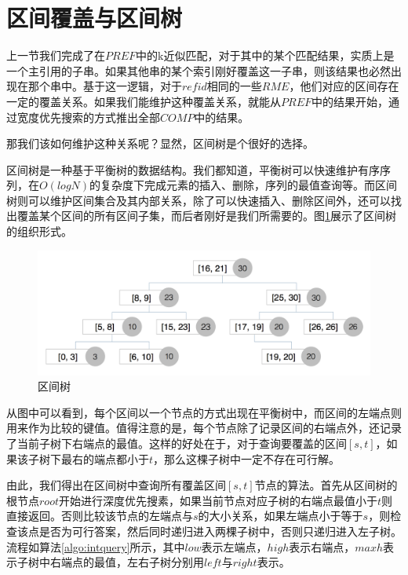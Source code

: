 ﻿\documentclass{sysuthesis}
\begin{document}
\section{区间覆盖与区间树}
上一节我们完成了在$PREF$中的k近似匹配，对于其中的某个匹配结果，实质上是一个主引用的子串。如果其他串的某个索引刚好覆盖这一子串，则该结果也必然出现在那个串中。基于这一逻辑，对于$refid$相同的一些$RME$，他们对应的区间存在一定的覆盖关系。如果我们能维护这种覆盖关系，就能从$PREF$中的结果开始，通过宽度优先搜索的方式推出全部$COMP$中的结果。\par
那我们该如何维护这种关系呢？显然，区间树\cite{cormen2009introduction}是个很好的选择。\par
区间树是一种基于平衡树的数据结构。我们都知道，平衡树可以快速维护有序序列，在$O(logN)$的复杂度下完成元素的插入、删除，序列的最值查询等。而区间树则可以维护区间集合及其内部关系，除了可以快速插入、删除区间外，还可以找出覆盖某个区间的所有区间子集，而后者刚好是我们所需要的。图\ref{image:intvtree}展示了区间树的组织形式。\par

\begin{figure}[htbp]
	\centering
	\includegraphics[scale=0.25]{image/intvtree.png}
	\caption{区间树}\label{image:intvtree}
\end{figure}

从图中可以看到，每个区间以一个节点的方式出现在平衡树中，而区间的左端点则用来作为比较的键值。值得注意的是，每个节点除了记录区间的右端点外，还记录了当前子树下右端点的最值。这样的好处在于，对于查询要覆盖的区间$[s, t]$，如果该子树下最右的端点都小于$t$，那么这棵子树中一定不存在可行解。\par
由此，我们得出在区间树中查询所有覆盖区间$[s, t]$节点的算法。首先从区间树的根节点$root$开始进行深度优先搜素，如果当前节点对应子树的右端点最值小于$t$则直接返回。否则比较该节点的左端点与$s$的大小关系，如果左端点小于等于$s$，则检查该点是否为可行答案，然后同时递归进入两棵子树中，否则只递归进入左子树。流程如算法\ref{algo:intquery}所示，其中$low$表示左端点，$high$表示右端点，$maxh$表示子树中右端点的最值，左右子树分别用$left$与$right$表示。\par
\end{document}
